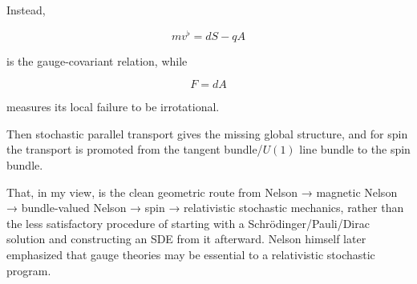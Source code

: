 Instead,

$$ \boxed{ m v^\flat=dS-qA } $$

is the gauge-covariant relation, while

$$ \boxed{ F=dA } $$

measures its local failure to be irrotational.

Then stochastic parallel transport gives the missing global structure, and for spin the transport is promoted from the tangent bundle/\(U(1)\) line bundle to the spin bundle.

That, in my view, is the clean geometric route from Nelson → magnetic Nelson → bundle-valued Nelson → spin → relativistic stochastic mechanics, rather than the less satisfactory procedure of starting with a Schrödinger/Pauli/Dirac solution and constructing an SDE from it afterward. Nelson himself later emphasized that gauge theories may be essential to a relativistic stochastic program.

